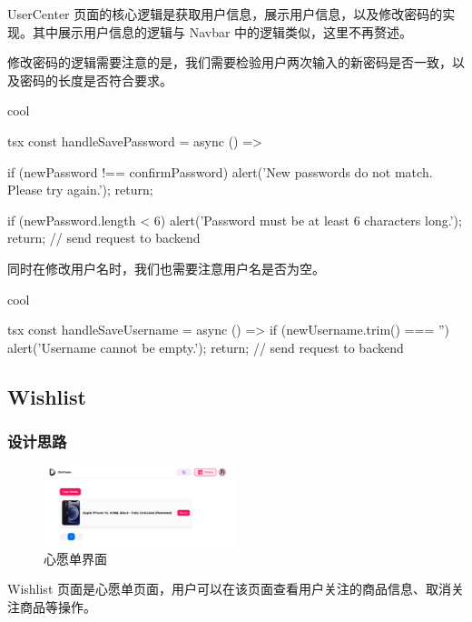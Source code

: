 UserCenter 页面的核心逻辑是获取用户信息，展示用户信息，以及修改密码的实现。其中展示用户信息的逻辑与 Navbar 中的逻辑类似，这里不再赘述。

修改密码的逻辑需要注意的是，我们需要检验用户两次输入的新密码是否一致，以及密码的长度是否符合要求。

\begin{codebox}{}{cool}
\begin{amzcode}{tsx}
const handleSavePassword = async () => {
    if (newPassword !== confirmPassword) {
        alert('New passwords do not match. Please try again.');
        return;
    }

    if (newPassword.length < 6) {
        alert('Password must be at least 6 characters long.');
        return;
    }
    // send request to backend
}
\end{amzcode}
\end{codebox}

同时在修改用户名时，我们也需要注意用户名是否为空。

\begin{codebox}{}{cool}
\begin{amzcode}{tsx}
const handleSaveUsername = async () => {
    if (newUsername.trim() === '') {
        alert('Username cannot be empty.');
        return;
    }
    // send request to backend
}
\end{amzcode}
\end{codebox}

\subsection{Wishlist}

\subsubsection{设计思路}

\begin{figure}[H]
\centering
\includegraphics[width=0.5\textwidth]{assets/report/wishlist_page.png}
\caption{心愿单界面}
\end{figure}

Wishlist 页面是心愿单页面，用户可以在该页面查看用户关注的商品信息、取消关注商品等操作。


